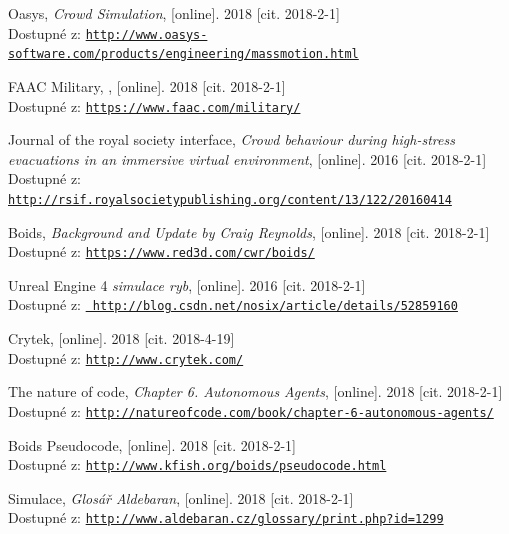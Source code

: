\documentclass[czech,public,dept460,male,cpdeclaration]{diploma}
\begin{document}
\begin{thebibliography}{99}
	
	 Oasys,
	\textit{Crowd Simulation}, [online]. 2018 [cit. 2018-2-1]\\
	Dostupné z: \href{http://www.oasys-software.com/products/engineering/massmotion.html}{\texttt{http://www.oasys-software.com/products/engineering/massmotion.html}}
	
	 FAAC Military,
	, [online]. 2018 [cit. 2018-2-1]\\
	Dostupné z: \href{https://www.faac.com/military/}{\texttt{https://www.faac.com/military/}}
	
	 Journal of the royal society interface, 
		\textit{Crowd behaviour during high-stress evacuations in an immersive virtual environment}, [online]. 2016 [cit. 2018-2-1]\\
		Dostupné z: \href{http://rsif.royalsocietypublishing.org/content/13/122/20160414}{\texttt{http://rsif.royalsocietypublishing.org/content/13/122/20160414}}
	
	 Boids, 
		\textit{Background and Update by Craig Reynolds}, [online]. 2018 [cit. 2018-2-1]\\
		Dostupné z: \href{https://www.red3d.com/cwr/boids/}{\texttt{https://www.red3d.com/cwr/boids/}}
	
	 Unreal Engine 4 \textit{simulace ryb}, [online]. 2016 [cit. 2018-2-1]\\
		Dostupné z: \href{		http://blog.csdn.net/nosix/article/details/52859160}{\texttt{		http://blog.csdn.net/nosix/article/details/52859160}}
	
	 Crytek, [online]. 2018 [cit. 2018-4-19]\\
	Dostupné z: \href{http://www.crytek.com/}{\texttt{http://www.crytek.com/}}
	
	 The nature of code, 
		\textit{Chapter 6. Autonomous Agents}, [online]. 2018 [cit. 2018-2-1]\\
		Dostupné z: \href{http://natureofcode.com/book/chapter-6-autonomous-agents/}{\texttt{http://natureofcode.com/book/chapter-6-autonomous-agents/}}

	 Boids Pseudocode, 
		[online]. 2018 [cit. 2018-2-1]\\
		Dostupné z: \href{http://www.kfish.org/boids/pseudocode.html}{\texttt{http://www.kfish.org/boids/pseudocode.html}}
		
	 Simulace,
		\textit{Glosář Aldebaran}, [online]. 2018 [cit. 2018-2-1]\\
		Dostupné z: \href{http://www.aldebaran.cz/glossary/print.php?id=1299}{\texttt{http://www.aldebaran.cz/glossary/print.php?id=1299}}
		

\end{thebibliography}
\end{document}
